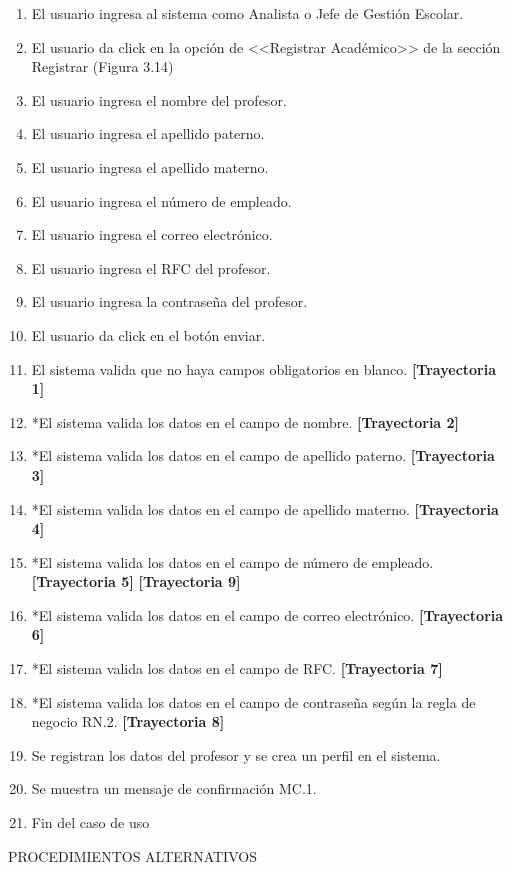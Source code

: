 \begin{enumerate}
    \item El usuario ingresa al sistema como Analista o Jefe de Gestión Escolar.
    \item El usuario da click en la opción de <<Registrar Académico>> de la sección Registrar (Figura 3.14)
    \item El usuario ingresa el nombre del profesor.
    \item El usuario ingresa el apellido paterno.
    \item El usuario ingresa el apellido materno.
    \item El usuario ingresa el número de empleado.
    \item El usuario ingresa el correo electrónico.
    \item El usuario ingresa el RFC del profesor.
    \item El usuario ingresa la contraseña del profesor.
    \item El usuario da click en el botón enviar.
    \item El sistema valida que no haya campos obligatorios en blanco. \textbf{[Trayectoria 1]}
    \item *El sistema valida los datos en el campo de nombre. \textbf{[Trayectoria 2]}
    \item *El sistema valida los datos en el campo de apellido paterno. \textbf{[Trayectoria 3]}
    \item *El sistema valida los datos en el campo de apellido materno. \textbf{[Trayectoria 4]}
    \item *El sistema valida los datos en el campo de número de empleado. \textbf{[Trayectoria 5]} \textbf{[Trayectoria 9]}
    \item *El sistema valida los datos en el campo de correo electrónico. \textbf{[Trayectoria 6]}
    \item *El sistema valida los datos en el campo de RFC. \textbf{[Trayectoria 7]}
    \item *El sistema valida los datos en el campo de contraseña según la regla de negocio RN.2. \textbf{[Trayectoria 8]}
    \item Se registran los datos del profesor y se crea un perfil en el sistema.
    \item Se muestra un mensaje de confirmación MC.1.
    \item Fin del caso de uso
\end{enumerate}
\vspace*{1cm}
\Large{PROCEDIMIENTOS ALTERNATIVOS}\\
